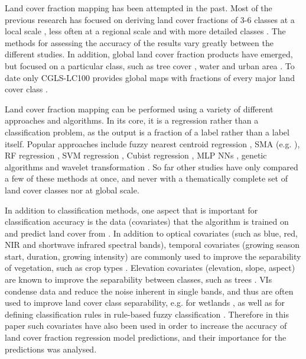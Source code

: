 \documentclass[review,authoryear,3p]{elsarticle}
\begin{document}
Land cover fraction mapping has been attempted in the past.
Most of the previous research has focused on deriving land cover fractions of 3-6 classes at a local scale  \citep{adams_classification_1995, foody1996fuzzyevaluation, walton2008subpixelrf, hansen_continuous_2011, sharma_assessing_2011, uma_shankar_wavelet-fuzzy_2011, dwivedi_optimisation_2012, lizarazo_quantitative_2012, gessner_estimating_2013, okujeni_generalizing_2018}, less often at a regional scale and with more detailed classes \citep{colditz_land_2011}.
The methods for assessing the accuracy of the results vary greatly between the different studies.
In addition, global land cover fraction products have emerged, but focused on a particular class, such as tree cover \citep{hansen_global_2003, Hansen2013forestchange}, water \citep{schroeder_development_2015} and urban area \citep{gao_mapping_2020}.
To date only \ac{CGLS-LC100} \citep{marcel_buchhorn_copernicus_2019} provides global maps with fractions of every major land cover class \citep{nandin-erdene_tsendbazar_copernicus_2019}.

Land cover fraction mapping can be performed using a variety of different approaches and algorithms.
In its core, it is a regression rather than a classification problem, as the output is a fraction of a label rather than a label itself.
Popular approaches include fuzzy nearest centroid regression \citep{zhang2001fullyfuzzy}, \ac{SMA} (e.g. \citealp{shimabukuro1991least, adams_classification_1995, hobbs2003linear, yang_landsat_2012}), \ac{RF} regression \citep{walton2008subpixelrf}, \gls{SVM} regression \citep{walton2008subpixelrf}, Cubist regression \citep{walton2008subpixelrf}, \gls{MLP} \glspl{NN} \citep{zhang2001fullyfuzzy}, genetic algorithms \citep{stavrakoudis_boosted_2011} and wavelet transformation \citep{uma_shankar_wavelet-fuzzy_2011}.
So far other studies have only compared a few of these methods at once, and never with a thematically complete set of land cover classes nor at global scale.

In addition to classification methods, one aspect that is important for classification accuracy is the data (covariates) that the algorithm is trained on and predict land cover from \citep{yu2014metadiscoveries}. In addition to optical covariates (such as blue, red, \gls{NIR} and shortwave infrared spectral bands), temporal covariates (growing season start, duration, growing intensity) are commonly used to improve the separability of vegetation, such as crop types \citep{jakubauskas2001harmonic}. Elevation covariates (elevation, slope, aspect) are known to improve the separability between classes, such as trees \citep{burrough2001fuzzy}. \Glspl{VI} condense data and reduce the noise inherent in single bands, and thus are often used to improve land cover class separability, e.g. for wetlands \citep{sader1995wetlands}, as well as for defining classification rules in rule-based fuzzy classification \citep{baraldi2006rulebased}. Therefore in this paper such covariates have also been used in order to increase the accuracy of land cover fraction regression model predictions, and their importance for the predictions was analysed.
\end{document}
